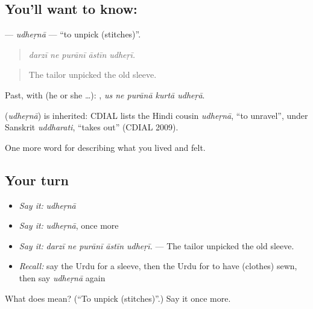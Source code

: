 \subsection*{You'll want to know: }
\textbf{} — \emph{udheṛnā} — \textquotedblleft{}to unpick (stitches)\textquotedblright{}.

\begin{quote}
    
\end{quote}

\begin{quote}
\emph{darzī ne purānī āstīn udheṛī.}
\end{quote}

\begin{quote}
The tailor unpicked the old sleeve.
\end{quote}

Past, with  (he or she …):     , \emph{us ne purānā kurtā udheṛā}.

\begin{cousinweb}
\textbf{} (\emph{udheṛnā}) is inherited: CDIAL lists the Hindi cousin \emph{udheṛnā}, \textquotedblleft{}to unravel\textquotedblright{}, under Sanskrit \emph{uddharati}, \textquotedblleft{}takes out\textquotedblright{} (CDIAL 2009).
\end{cousinweb}

\begin{grammarlens}[title={What you've built}]
One more word for describing what you lived and felt.
\end{grammarlens}

\subsection*{Your turn}
\begin{itemize}
\raggedright
  \item \emph{Say it:} \emph{udheṛnā}
  \item \emph{Say it:} \emph{udheṛnā}, once more
  \item \emph{Say it:} \emph{darzī ne purānī āstīn udheṛī.} — The tailor unpicked the old sleeve.
  \item \emph{Recall:} say the Urdu for a sleeve, then the Urdu for to have (clothes) sewn, then say \emph{udheṛnā} again
\end{itemize}

\begin{tcolorbox}[breakable,colback=teal!4,colframe=teal!35!black,title={Before you move on}]
What does  mean? (\textquotedblleft{}To unpick (stitches)\textquotedblright{}.) Say it once more.
\end{tcolorbox}
